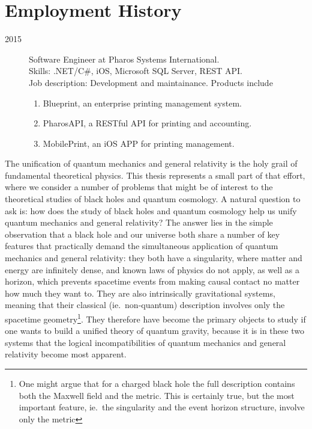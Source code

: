 \documentclass{brownthesis}
\begin{document}
\section*{Employment History}
\begin{description}
\item[2015] Software Engineer at Pharos Systems International.\\
  {Skills:} .NET/C\#, iOS, Microsoft SQL Server, REST API.\\
  {Job description:} Development and maintainance. Products include
  \begin{enumerate}
  \item Blueprint, an enterprise printing management system.
  \item PharosAPI, a RESTful API for printing and accounting.
  \item MobilePrint, an iOS APP for printing management.
  \end{enumerate}
\end{description}

The unification of quantum mechanics and general relativity is the holy grail of fundamental theoretical physics. This thesis represents a small part of that effort, where we consider a number of problems that might be of interest to the theoretical studies of black holes and quantum cosmology. A natural question to ask is: how does the study of black holes and quantum cosmology help us unify quantum mechanics and general relativity? The answer lies in the simple observation that a black hole and our universe both share a number of key features that practically demand the simultaneous application of quantum mechanics and general relativity: they both have a singularity, where matter and energy are infinitely dense, and known laws of physics do not apply, as well as a horizon, which prevents spacetime events from making causal contact no matter how much they want to. They are also intrinsically gravitational systems, meaning that their classical (ie.~non-quantum) description involves only the spacetime geometry\footnote{One might argue that for a charged black hole the full description contains both the Maxwell field and the metric. This is certainly true, but the most important feature, ie.~the singularity and the event horizon structure, involve only the metric}. They therefore have become the primary objects to study if one wants to build a unified theory of quantum gravity, because it is in these two systems that the logical incompatibilities of quantum mechanics and general relativity become most apparent.
\end{document}
